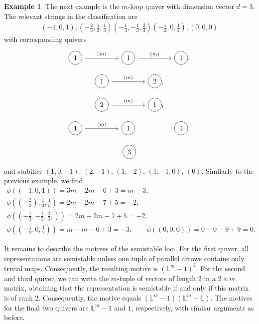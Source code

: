 \documentclass[pdftex]{sigma}
\newcommand\circlearound[1]{
 \tikz[baseline]\node[draw,shape=circle,anchor=base] {#1} ;}
\numberwithin{equation}{section}
\theoremstyle{definition}
\newtheorem{Example}[Theorem]{Example}
\begin{document}
\begin{Example}
The next example is the $m$-loop quiver with dimension vector $d =3$. The relevant strings in the classification are
\begin{align*}
(-1,0,1), \left(-\frac{2}{3},\frac{1}{3},\frac{1}{3}\right)\left(-\frac{1}{3},-\frac{1}{3},\frac{2}{3}\right) \left(-\frac{1}{2},0, \frac{1}{2}\right), (0,0,0)
\end{align*}
with corresponding quivers
\[\begin{tikzcd}
	\circlearound{1} && \circlearound{1} && \circlearound{1}
	\arrow[from=1-1, to=1-3, "(m)"] \arrow[from=1-3, to=1-5, "(m)"] ,
\end{tikzcd}\]
\[\begin{tikzcd}
	\circlearound{1} && \circlearound{2}
	\arrow[from=1-1, to=1-3, "(m)"] ,
\end{tikzcd}\]
\[\begin{tikzcd}
	\circlearound{2} && \circlearound{1}
	\arrow[from=1-1, to=1-3, "(m)"] ,
\end{tikzcd}\]
\[\begin{tikzcd}
	\circlearound{1} && \circlearound{1} && \circlearound{1}
	\arrow[from=1-1, to=1-3, "(m)"] ,
\end{tikzcd}\]
\[\begin{tikzcd}
	\circlearound{3}
\end{tikzcd}\]
and stability
$(1,0,-1)$, $(2,-1)$, $(1,-2)$, $(1,-1,0)$, $(0) $.
Similarly to the previous example, we find
\begin{gather*}
\phi((-1,0,1)) = 3m -2m -6+3 = m -3 ,\\
\phi\left(\left(-\frac{2}{3}\right), \frac{1}{3},\frac{1}{3}\right) = 2m -2m -7+5 = -2, \\
\phi\left(\left(-\frac{1}{3},-\frac{1}{3},\frac{2}{3},\right)\right) = 2m -2m - 7+ 5 = -2,\\
\phi\left(\left(-\frac{1}{2},0, \frac{1}{2}\right)\right) = m-m -6+3 = -3,\qquad
\phi((0,0,0)) = 0 -0 -9+9 = 0.
\end{gather*}

It remains to describe the motives of the semistable loci. For the first quiver, all representations are semistable unless one tuple of parallel arrows contains only trivial maps. Consequently, the resulting motive is $(\mathbb{L}^m -1)^2$. For the second and third quiver, we can write the $m$-tuple of vectors of length $2$ in a $2 \times m$ matrix, obtaining that the representation is semistable if and only if this matrix is of rank $2$. Consequently, the motive equals $(\mathbb{L}^m -1 )(\mathbb{L}^m - \mathbb{L})$. The motives for the final two quivers are $\mathbb{L}^m -1$ and $1$, respectively, with similar arguments as before.


\end{Example}
\end{document}
